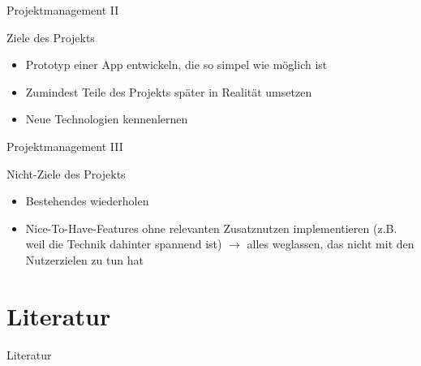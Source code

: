 \documentclass[presentation,bigger,aspectratio=169]{beamer}
\begin{document}
\begin{frame}[label={sec:org4cee048}]{Projektmanagement II}
\begin{block}{Ziele des Projekts}
\begin{itemize}
\item Prototyp einer App entwickeln, die so simpel wie möglich ist
\item Zumindest Teile des Projekts später in Realität umsetzen
\item Neue Technologien kennenlernen
\end{itemize}
\end{block}
\end{frame}
\begin{frame}[label={sec:orgfa96209}]{Projektmanagement III}
\begin{block}{Nicht-Ziele des Projekts}
\begin{itemize}
\item Bestehendes wiederholen
\item Nice-To-Have-Features ohne relevanten Zusatznutzen implementieren (z.B. weil
die Technik dahinter spannend ist) \(\to\) alles weglassen, das nicht mit
den Nutzerzielen zu tun hat
\end{itemize}
\end{block}
\end{frame}

\section*{Literatur}
\label{sec:org29cfa70}
\begin{frame}[allowframebreaks]{Literatur}
\printbibliography[heading=none]
\end{frame}
\appendix
\end{document}
